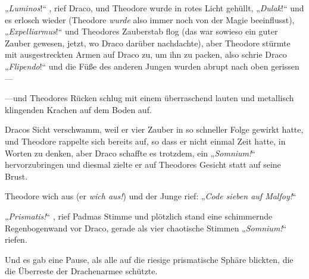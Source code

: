 „\emph{Luminos}!“ , rief Draco, und Theodore wurde in rotes Licht gehüllt, „\emph{Dulak}!“ und es erlosch wieder (Theodore \emph{wurde} also immer noch von der Magie beeinflusst), „\emph{Expelliarmus}!“ und Theodores Zauberstab flog (das war sowieso ein guter Zauber gewesen, jetzt, wo Draco darüber nachdachte), aber Theodore stürmte mit ausgestreckten Armen auf Draco zu, um ihn zu packen, also schrie Draco „\emph{Flipendo}!“ und die Füße des anderen Jungen wurden abrupt nach oben gerissen—

—und Theodores Rücken schlug mit einem überraschend lauten und metallisch klingenden Krachen auf dem Boden auf.

Dracos Sicht verschwamm, weil er vier Zauber in so schneller Folge gewirkt hatte, und Theodore rappelte sich bereits auf, so dass er nicht einmal Zeit hatte, in Worten zu denken, aber Draco schaffte es trotzdem, ein „\emph{Somnium!}“ hervorzubringen und diesmal zielte er auf Theodores Gesicht statt auf seine Brust.

Theodore wich aus (er \emph{wich aus!}) und der Junge rief: „\emph{Code sieben auf Malfoy!}“

„\emph{Prismatis!}“ , rief Padmas Stimme und plötzlich stand eine schimmernde Regenbogenwand vor Draco, gerade als vier chaotische Stimmen „\emph{Somnium!}“ riefen.

Und es gab eine Pause, als alle auf die riesige prismatische Sphäre blickten, die die Überreste der Drachenarmee schützte.

